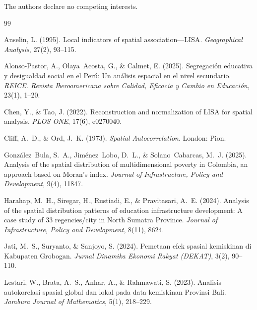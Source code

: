 \documentclass[12pt,a4paper,twoside]{article}
\begin{document}
The authors declare no competing interests.

% 

\begin{thebibliography}{99}

Anselin, L. (1995).
Local indicators of spatial association---{LISA}.
\textit{Geographical Analysis}, 27(2), 93--115.

Alonso-Pastor, A., Olaya~Acosta, G., \& Calmet, E. (2025).
Segregación educativa y desigualdad social en el {Perú}: Un análisis espacial
en el nivel secundario.
\textit{REICE. Revista Iberoamericana sobre Calidad, Eficacia y Cambio en
Educación}, 23(1), 1--20.

Chen, Y., \& Tao, J. (2022).
Reconstruction and normalization of {LISA} for spatial analysis.
\textit{PLOS ONE}, 17(6), e0270040.

Cliff, A.~D., \& Ord, J.~K. (1973).
\textit{Spatial Autocorrelation}.
London: Pion.

González~Bula, S.~A., Jiménez~Lobo, D.~L., \& Solano~Cabarcas, M.~J. (2025).
Analysis of the spatial distribution of multidimensional poverty in {Colombia},
an approach based on {Moran}'s index.
\textit{Journal of Infrastructure, Policy and Development}, 9(4), 11847.

Harahap, M.~H., Siregar, H., Rustiadi, E., \& Pravitasari, A.~E. (2024).
Analysis of the spatial distribution patterns of education infrastructure
development: A case study of 33 regencies/city in {North Sumatra Province}.
\textit{Journal of Infrastructure, Policy and Development}, 8(11), 8624.

Jati, M.~S., Suryanto, \& Sanjoyo, S. (2024).
Pemetaan efek spasial kemiskinan di {Kabupaten Grobogan}.
\textit{Jurnal Dinamika Ekonomi Rakyat (DEKAT)}, 3(2), 90--110.

Lestari, W., Brata, A.~S., Anhar, A., \& Rahmawati, S. (2023).
Analisis autokorelasi spasial global dan lokal pada data kemiskinan
{Provinsi Bali}.
\textit{Jambura Journal of Mathematics}, 5(1), 218--229.


\end{thebibliography}
\end{document}
